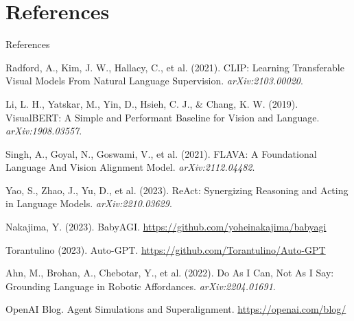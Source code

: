 \section*{References}
\begin{frame}[allowframebreaks]{References}
    \scriptsize
    \begin{thebibliography}{99}
        Radford, A., Kim, J. W., Hallacy, C., et al. (2021).
        \newblock CLIP: Learning Transferable Visual Models From Natural Language Supervision.
        \newblock \textit{arXiv:2103.00020}.

        Li, L. H., Yatskar, M., Yin, D., Hsieh, C. J., & Chang, K. W. (2019).
        \newblock VisualBERT: A Simple and Performant Baseline for Vision and Language.
        \newblock \textit{arXiv:1908.03557}.

        Singh, A., Goyal, N., Goswami, V., et al. (2021).
        \newblock FLAVA: A Foundational Language And Vision Alignment Model.
        \newblock \textit{arXiv:2112.04482}.

        Yao, S., Zhao, J., Yu, D., et al. (2023).
        \newblock ReAct: Synergizing Reasoning and Acting in Language Models.
        \newblock \textit{arXiv:2210.03629}.

        Nakajima, Y. (2023).
        \newblock BabyAGI.
        \newblock \url{https://github.com/yoheinakajima/babyagi}

        Torantulino (2023).
        \newblock Auto-GPT.
        \newblock \url{https://github.com/Torantulino/Auto-GPT}

        Ahn, M., Brohan, A., Chebotar, Y., et al. (2022).
        \newblock Do As I Can, Not As I Say: Grounding Language in Robotic Affordances.
        \newblock \textit{arXiv:2204.01691}.

        OpenAI Blog.
        \newblock Agent Simulations and Superalignment.
        \newblock \url{https://openai.com/blog/}
    \end{thebibliography}
\end{frame}